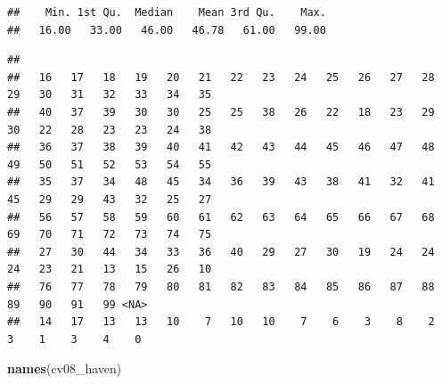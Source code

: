 \documentclass[
]{book}
\newenvironment{Shaded}{\begin{snugshade}}{\end{snugshade}}
\newcommand{\DataTypeTok}[1]{\textcolor[rgb]{0.13,0.29,0.53}{#1}}
\newcommand{\KeywordTok}[1]{\textcolor[rgb]{0.13,0.29,0.53}{\textbf{#1}}}
\newcommand{\NormalTok}[1]{#1}
\newcommand{\OperatorTok}[1]{\textcolor[rgb]{0.81,0.36,0.00}{\textbf{#1}}}
\newcommand{\StringTok}[1]{\textcolor[rgb]{0.31,0.60,0.02}{#1}}
\begin{document}
\begin{Shaded}
\end{Shaded}

\begin{verbatim}
##    Min. 1st Qu.  Median    Mean 3rd Qu.    Max. 
##   16.00   33.00   46.00   46.78   61.00   99.00
\end{verbatim}

\begin{Shaded}
\end{Shaded}

\begin{verbatim}
## 
##   16   17   18   19   20   21   22   23   24   25   26   27   28   29   30   31   32   33   34   35 
##   40   37   39   30   30   25   25   38   26   22   18   23   29   30   22   28   23   23   24   38 
##   36   37   38   39   40   41   42   43   44   45   46   47   48   49   50   51   52   53   54   55 
##   35   37   34   48   45   34   36   39   43   38   41   32   41   45   29   29   43   32   25   27 
##   56   57   58   59   60   61   62   63   64   65   66   67   68   69   70   71   72   73   74   75 
##   27   30   44   34   33   36   40   29   27   30   19   24   24   24   23   21   13   15   26   10 
##   76   77   78   79   80   81   82   83   84   85   86   87   88   89   90   91   99 <NA> 
##   14   17   13   13   10    7   10   10    7    6    3    8    2    3    1    3    4    0
\end{verbatim}

\begin{Shaded}
\begin{Highlighting}[numbers=left,,]
\KeywordTok{names}\NormalTok{(cv08_haven)}
\end{Highlighting}
\end{Shaded}
\end{document}

